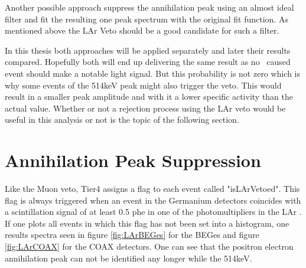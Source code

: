 \documentclass[encoding=utf8,british]{tumphthesis}
\begin{document}
Another possible approach suppress the annihilation peak using an almost ideal filter and fit the resulting one peak spectrum with the original fit function.
As mentioned above the LAr Veto should be a good candidate for such a filter.

In this thesis both approaches will be applied separately and later their results compared.
Hopefully both will end up delivering the same result as no \Kr\ caused event should make a notable light signal.
But this probability is not zero which is why some events of the 514keV peak might also trigger the veto.
This would result in a smaller peak amplitude and with it a lower specific activity than the actual value. 
Whether or not a rejection process using the LAr veto would be useful in this analysis or not is the topic of the following section.
\\

\section{Annihilation Peak Suppression}
\label{sec:APS}

Like the Muon veto, Tier4 assigns a flag to each event called "isLArVetoed".
This flag is always triggered when an event in the Germanium detectors coincides with a scintillation signal of at least 0.5 phe in one of the photomultipliers in the LAr \cite{agostini_background_2017}.
If one plots all events in which this flag has not been set into a histogram, one results spectra seen in figure \ref{fig:LArBEGes} for the BEGes and figure \ref{fig:LArCOAX} for the COAX detectors.
One can see that the positron electron annihilation peak can not be identified any longer while the 514keV.
\\
\end{document}
